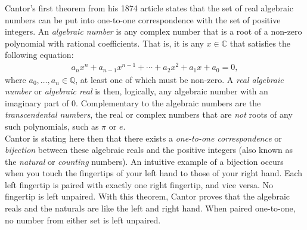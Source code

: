 Cantor's first theorem from his 1874 article states that the set of real algebraic numbers can be put into one-to-one correspondence with the set of positive integers. An \textit{algebraic number} is any complex number that is a root of a non-zero polynomial with rational coefficients. That is, it is any $x\in\mathbb{C}$ that satisfies the following equation:
\begin{align*}
a_nx^n+a_{n-1}x^{n-1}+\cdots+a_2x^2+a_1x+a_0=0,
\end{align*}
where $a_0,\dots,a_n\in\mathbb{Q}$, at least one of which must be non-zero. A \textit{real algebraic number} or \textit{algebraic real} is then, logically, any algebraic number with an imaginary part of $0$. Complementary to the algebraic numbers are the \textit{transcendental numbers}, the real or complex numbers that are \textit{not} roots of any such polynomials, such as $\pi$ or $e$. \\

Cantor is stating here then that there exists a \textit{one-to-one correspondence} or \textit{bijection} between these algebraic reals and the positive integers (also known as the \textit{natural} or \textit{counting} numbers). An intuitive example of a bijection occurs when you touch the fingertips of your left hand to those of your right hand. Each left fingertip is paired with exactly one right fingertip, and vice versa. No fingertip is left unpaired. With this theorem, Cantor proves that the algebraic reals and the naturals are like the left and right hand. When paired one-to-one, no number from either set is left unpaired. \\


